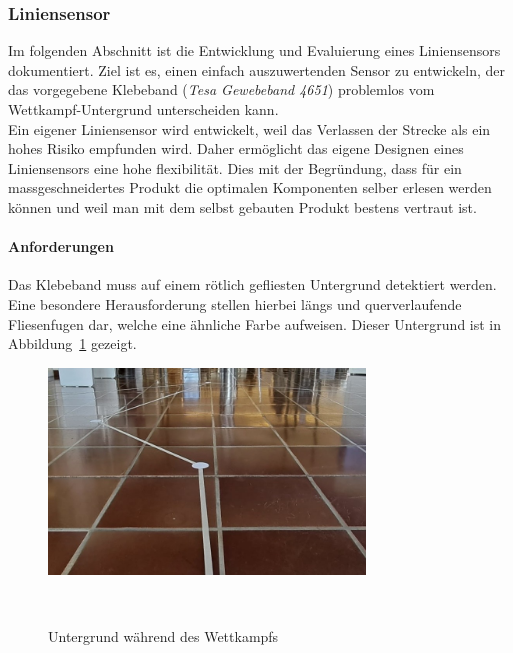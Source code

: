 \documentclass[main.tex]{subfiles} %
\begin{document}

\subsubsection{Liniensensor}

Im folgenden Abschnitt ist die Entwicklung und Evaluierung eines Liniensensors
dokumentiert. Ziel ist es, einen einfach auszuwertenden Sensor zu entwickeln,
der das vorgegebene Klebeband (\textit{Tesa Gewebeband 4651}) problemlos vom Wettkampf-Untergrund unterscheiden kann.\\
Ein eigener Liniensensor wird entwickelt, weil das Verlassen der Strecke als ein hohes Risiko empfunden wird. Daher ermöglicht
das eigene Designen eines Liniensensors eine hohe flexibilität. Dies mit der Begründung, dass für ein massgeschneidertes Produkt 
die optimalen Komponenten selber erlesen werden können und weil man mit dem selbst gebauten Produkt bestens vertraut ist.


\paragraph{Anforderungen}

Das Klebeband muss auf einem rötlich
gefliesten Untergrund detektiert werden. Eine besondere Herausforderung
stellen hierbei längs und querverlaufende Fliesenfugen dar, welche eine
ähnliche Farbe aufweisen. Dieser Untergrund ist in
Abbildung~\ref{fig:Untergrund_Wettkampf} gezeigt.

\begin{figure}[H]
    \centering
    \includegraphics[width=0.75\textwidth]{fig_Strecke_Tracken/Bild_Untergrund.jpg}
    \caption{Untergrund während des Wettkampfs}~\label{fig:Untergrund_Wettkampf}
\end{figure}
\end{document}
